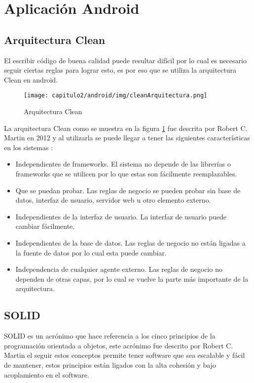 \section{Aplicación Android} 
\subsection{Arquitectura Clean}
El escribir código de buena calidad puede resultar difícil por lo cual es necesario seguir ciertas reglas para lograr esto, es por eso que se utiliza la arquitectura Clean en android.

\begin{figure}[H]
        \centering
        \texttt{[image: capitulo2/android/img/cleanArquitectura.png]}
        \caption{Arquitectura Clean \cite{cleanCodeBlog}} 
        \label{fig:cleanArquitectura}
\end{figure}

La arquitectura Clean como se muestra en la figura \ref{fig:cleanArquitectura} fue descrita por Robert C. Martin en 2012 y al utilizarla se puede llegar a tener las siguientes características en los sistemas \cite{cleanCodeBlog}:
\begin{itemize}
    \item Independientes de frameworks. El sistema no depende de las librerías o frameworks que se utilicen por lo que estas son fácilmente reemplazables.
    \item Que se puedan probar. Las reglas de negocio se pueden probar sin base de datos, interfaz de usuario, servidor web u otro elemento externo.
    \item Independientes de la interfaz de usuario. La interfaz de usuario puede cambiar fácilmente.
    \item Independientes de la base de datos. Las reglas de negocio no están ligadas a la fuente de datos por lo cual esta puede cambiar.
    \item Independencia de cualquier agente externo. Las reglas de negocio no dependen de otras capas, por lo cual se vuelve la parte más importante de la arquitectura.
\end{itemize}
\subsection{SOLID}
SOLID es un acrónimo que hace referencia a los cinco principios de la programación orientada a objetos, este acrónimo fue descrito por Robert C. Martin el seguir estos conceptos permite tener software que sea escalable y fácil de mantener, estos principios están ligados con la alta cohesión y bajo acoplamiento en el software. \cite{solidCode}
